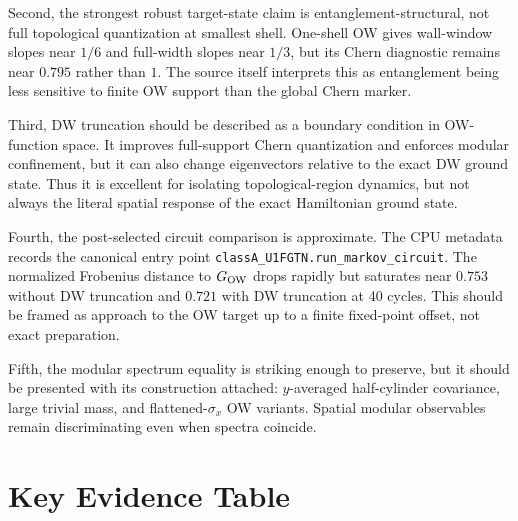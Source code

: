 \documentclass[aps,prb,onecolumn,nofootinbib,superscriptaddress]{revtex4-2}
\newcommand{\GO}{G_{\rm OW}}
\begin{document}
Second, the strongest robust target-state claim is entanglement-structural, not full topological quantization at smallest shell.  One-shell OW gives wall-window slopes near $1/6$ and full-width slopes near $1/3$, but its Chern diagnostic remains near $0.795$ rather than $1$.  The source itself interprets this as entanglement being less sensitive to finite OW support than the global Chern marker.

Third, DW truncation should be described as a boundary condition in OW-function space.  It improves full-support Chern quantization and enforces modular confinement, but it can also change eigenvectors relative to the exact DW ground state.  Thus it is excellent for isolating topological-region dynamics, but not always the literal spatial response of the exact Hamiltonian ground state.

Fourth, the post-selected circuit comparison is approximate.  The CPU metadata records the canonical entry point \texttt{classA\_U1FGTN.run\_markov\_circuit}.  The normalized Frobenius distance to $\GO$ drops rapidly but saturates near $0.753$ without DW truncation and $0.721$ with DW truncation at 40 cycles.  This should be framed as approach to the OW target up to a finite fixed-point offset, not exact preparation.

Fifth, the modular spectrum equality is striking enough to preserve, but it should be presented with its construction attached: $y$-averaged half-cylinder covariance, large trivial mass, and flattened-$\sigma_x$ OW variants.  Spatial modular observables remain discriminating even when spectra coincide.

\section{Key Evidence Table}
\end{document}
